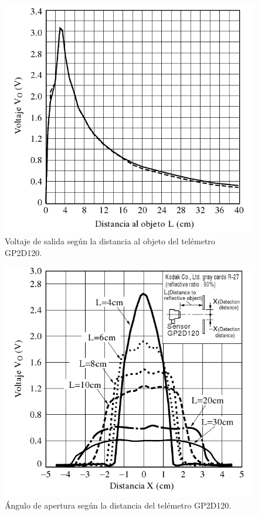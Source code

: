 \begin{figure}[ht]
	\centering
	\includegraphics[scale=0.35]{tel-VxL.png}
	\caption{Voltaje de salida seg\'un la distancia al objeto del tel\'emetro GP2D120.}
	\label{HFteldistancia}
\end{figure}


\begin{figure}[ht]
	\centering
	\includegraphics[scale=0.35]{tel-VxX.png}
	\caption{\'Angulo de apertura seg\'un la distancia del tel\'emetro GP2D120.}
	\label{HFtelapertura}
\end{figure}

